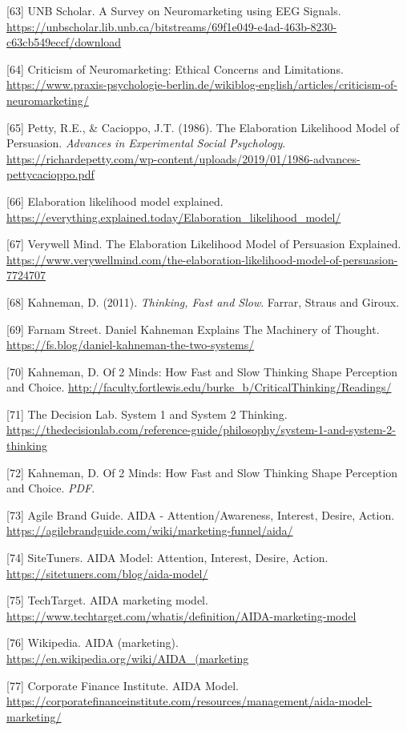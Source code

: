 \documentclass[11pt,letterpaper]{article}
\begin{document}
\begin{list}{}{\setlength{\leftmargin}{2em}\setlength{\itemindent}{-2em}\setlength{\itemsep}{2pt}}
\item[{[63]}] UNB Scholar. A Survey on Neuromarketing using EEG Signals. \url{https://unbscholar.lib.unb.ca/bitstreams/69f1e049-e4ad-463b-8230-c63cb549eccf/download}
\item[{[64]}] Criticism of Neuromarketing: Ethical Concerns and Limitations. \url{https://www.praxis-psychologie-berlin.de/wikiblog-english/articles/criticism-of-neuromarketing/}
\item[{[65]}] Petty, R.E., \& Cacioppo, J.T. (1986). The Elaboration Likelihood Model of Persuasion. \textit{Advances in Experimental Social Psychology}. \url{https://richardepetty.com/wp-content/uploads/2019/01/1986-advances-pettycacioppo.pdf}
\item[{[66]}] Elaboration likelihood model explained. \url{https://everything.explained.today/Elaboration_likelihood_model/}
\item[{[67]}] Verywell Mind. The Elaboration Likelihood Model of Persuasion Explained. \url{https://www.verywellmind.com/the-elaboration-likelihood-model-of-persuasion-7724707}
\item[{[68]}] Kahneman, D. (2011). \textit{Thinking, Fast and Slow}. Farrar, Straus and Giroux.
\item[{[69]}] Farnam Street. Daniel Kahneman Explains The Machinery of Thought. \url{https://fs.blog/daniel-kahneman-the-two-systems/}
\item[{[70]}] Kahneman, D. Of 2 Minds: How Fast and Slow Thinking Shape Perception and Choice. \url{http://faculty.fortlewis.edu/burke_b/CriticalThinking/Readings/}
\item[{[71]}] The Decision Lab. System 1 and System 2 Thinking. \url{https://thedecisionlab.com/reference-guide/philosophy/system-1-and-system-2-thinking}
\item[{[72]}] Kahneman, D. Of 2 Minds: How Fast and Slow Thinking Shape Perception and Choice. \textit{PDF}.
\item[{[73]}] Agile Brand Guide. AIDA - Attention/Awareness, Interest, Desire, Action. \url{https://agilebrandguide.com/wiki/marketing-funnel/aida/}
\item[{[74]}] SiteTuners. AIDA Model: Attention, Interest, Desire, Action. \url{https://sitetuners.com/blog/aida-model/}
\item[{[75]}] TechTarget. AIDA marketing model. \url{https://www.techtarget.com/whatis/definition/AIDA-marketing-model}
\item[{[76]}] Wikipedia. AIDA (marketing). \url{https://en.wikipedia.org/wiki/AIDA_(marketing}
\item[{[77]}] Corporate Finance Institute. AIDA Model. \url{https://corporatefinanceinstitute.com/resources/management/aida-model-marketing/}

\end{list}
\end{document}
